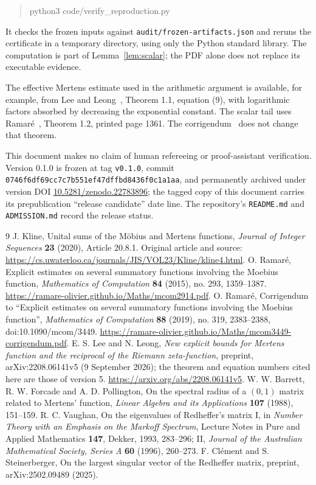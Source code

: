 \documentclass[11pt]{article}
\theoremstyle{remark}\newtheorem{remark}[theorem]{Remark}
\begin{document}
\begin{quote}\ttfamily python3 code/verify\_reproduction.py\end{quote}
It checks the frozen inputs against \texttt{audit/frozen-artifacts.json} and reruns the certificate in a temporary directory, using only the Python standard library. The computation is part of Lemma~\ref{lem:scalar}; the PDF alone does not replace its executable evidence.

The effective Mertens estimate used in the arithmetic argument is available, for example, from Lee and Leong~\cite{lee}, Theorem 1.1, equation (9), with logarithmic factors absorbed by decreasing the exponential constant. The scalar tail uses Ramar\'e~\cite{ramare}, Theorem 1.2, printed page 1361. The corrigendum~\cite{corr} does not change that theorem.

This document makes no claim of human refereeing or proof-assistant verification. Version 0.1.0 is frozen at tag \texttt{v0.1.0}, commit \texttt{0746f6df69cc7c7b551ef47dffbd8436f0c1a1aa}, and permanently archived under version DOI \href{https://doi.org/10.5281/zenodo.22783896}{10.5281/zenodo.22783896}; the tagged copy of this document carries its prepublication ``release candidate'' date line. The repository's \texttt{README.md} and \texttt{ADMISSION.md} record the release status.

\begin{thebibliography}{9}
 J. Kline, Unital sums of the M\"obius and Mertens functions, \emph{Journal of Integer Sequences} \textbf{23} (2020), Article 20.8.1. Original article and source: \url{https://cs.uwaterloo.ca/journals/JIS/VOL23/Kline/kline4.html}.
 O. Ramar\'e, Explicit estimates on several summatory functions involving the Moebius function, \emph{Mathematics of Computation} \textbf{84} (2015), no. 293, 1359--1387. \url{https://ramare-olivier.github.io/Maths/mcom2914.pdf}.
 O. Ramar\'e, Corrigendum to ``Explicit estimates on several summatory functions involving the Moebius function'', \emph{Mathematics of Computation} \textbf{88} (2019), no. 319, 2383--2388, doi:10.1090/mcom/3449. \url{https://ramare-olivier.github.io/Maths/mcom3449-corrigendum.pdf}.
 E. S. Lee and N. Leong, \emph{New explicit bounds for Mertens function and the reciprocal of the Riemann zeta-function}, preprint, arXiv:2208.06141v5 (9 September 2026); the theorem and equation numbers cited here are those of version 5. \url{https://arxiv.org/abs/2208.06141v5}.
 W. W. Barrett, R. W. Forcade and A. D. Pollington, On the spectral radius of a $(0,1)$ matrix related to Mertens' function, \emph{Linear Algebra and its Applications} \textbf{107} (1988), 151--159.
 R. C. Vaughan, On the eigenvalues of Redheffer's matrix I, in \emph{Number Theory with an Emphasis on the Markoff Spectrum}, Lecture Notes in Pure and Applied Mathematics \textbf{147}, Dekker, 1993, 283--296; II, \emph{Journal of the Australian Mathematical Society, Series A} \textbf{60} (1996), 260--273.
 F. Cl\'ement and S. Steinerberger, On the largest singular vector of the Redheffer matrix, preprint, arXiv:2502.09489 (2025).
\end{thebibliography}
\end{document}
